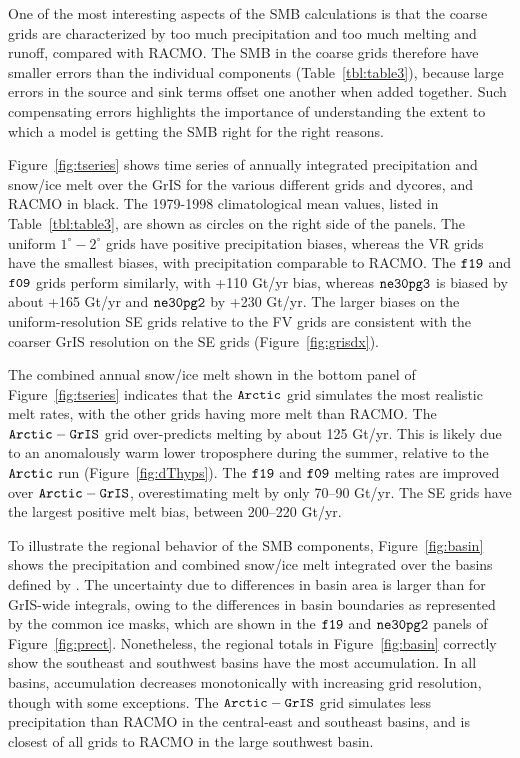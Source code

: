 \documentclass[draft]{agujournal2019}
\begin{document}
One of the most interesting aspects of the SMB calculations is that the coarse grids are characterized by too much precipitation and too much melting and runoff, compared with RACMO. The SMB in the coarse grids therefore have smaller errors than the individual components (Table~\ref{tbl:table3}), because large errors in the source and sink terms offset one another when added together. Such compensating errors highlights the importance of understanding the extent to which a model is getting the SMB right for the right reasons.

Figure~\ref{fig:tseries} shows time series of annually integrated precipitation and snow/ice melt over the GrIS for the various different grids and dycores, and RACMO in black. The 1979-1998 climatological mean values, listed in Table~\ref{tbl:table3}, are shown as circles on the right side of the panels. The uniform $1^{\circ}-2^{\circ}$ grids have positive precipitation biases, whereas the VR grids have the smallest biases, with precipitation comparable to RACMO. The $\tt f19$ and $\tt f09$ grids perform similarly, with +110 Gt/yr bias, whereas $\tt ne30pg3$ is biased by about +165 Gt/yr and $\tt ne30pg2$ by +230 Gt/yr. The larger biases on the uniform-resolution SE grids relative to the FV grids are consistent with the coarser GrIS resolution on the SE grids (Figure~\ref{fig:grisdx}).

The combined annual snow/ice melt shown in the bottom panel of Figure~\ref{fig:tseries} indicates that the $\tt Arctic$ grid simulates the most realistic melt rates, with the other grids having more melt than RACMO. The $\tt Arctic-GrIS$ grid over-predicts melting by about 125 Gt/yr. This is likely due to an anomalously warm lower troposphere during the summer, relative to the $\tt Arctic$ run (Figure~\ref{fig:dThyps}). The $\tt f19$ and $\tt f09$ melting rates are improved over $\tt Arctic-GrIS$, overestimating melt by only 70--90 Gt/yr. The SE grids have the largest positive melt bias, between 200--220 Gt/yr. %

To illustrate the regional behavior of the SMB components, Figure~\ref{fig:basin} shows the precipitation and combined snow/ice melt integrated over the basins defined by . The uncertainty due to differences in basin area is larger than for GrIS-wide integrals, owing to the differences in basin boundaries as represented by the common ice masks, which are shown in the $\tt f19$ and $\tt ne30pg2$ panels of Figure~\ref{fig:prect}. Nonetheless, the regional totals in Figure~\ref{fig:basin} correctly show the southeast and southwest basins have the most accumulation. In all basins, accumulation decreases monotonically with increasing grid resolution, though with some exceptions. The $\tt Arctic-GrIS$ grid simulates less precipitation than RACMO in the central-east and southeast basins, and is closest of all grids to RACMO in the large southwest basin.
\end{document}

